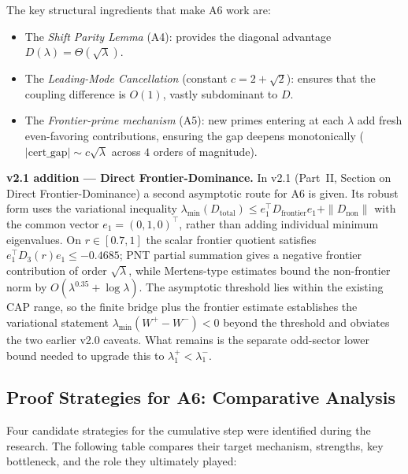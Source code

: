 \documentclass[12pt,a4paper]{article}
\theoremstyle{definition}
\theoremstyle{remark}
\begin{document}
\noindent The key structural ingredients that make A6 work are:
\begin{itemize}
  \item The \emph{Shift Parity Lemma} (A4): provides the diagonal advantage $D(\lambda) = \Theta(\sqrt{\lambda})$.
  \item The \emph{Leading-Mode Cancellation} (constant $c = 2 + \sqrt{2}$): ensures that the coupling difference is $O(1)$, vastly subdominant to $D$.
  \item The \emph{Frontier-prime mechanism} (A5): new primes entering at each $\lambda$ add fresh even-favoring contributions, ensuring the gap deepens monotonically ($|\mathrm{cert\_gap}| \sim c\sqrt{\lambda}$ across $4$ orders of magnitude).
\end{itemize}

\smallskip
\noindent\textbf{v2.1 addition --- Direct Frontier-Dominance.} In v2.1
(Part~II, Section on Direct Frontier-Dominance) a second asymptotic route for
A6 is given. Its robust form uses the variational inequality
$\lambda_{\min}(D_{\mathrm{total}})\leq e_1^\top D_{\mathrm{frontier}}e_1+\|D_{\mathrm{non}}\|$
with the common vector $e_1=(0,1,0)^\top$, rather than adding individual
minimum eigenvalues. On $r\in[0.7,1]$ the scalar frontier quotient satisfies
$e_1^\top D_3(r)e_1\leq -0.4685$; PNT partial summation gives a negative
frontier contribution of order $\sqrt{\lambda}$, while Mertens-type
estimates bound the non-frontier norm by $O(\lambda^{0.35}+\log\lambda)$.
The asymptotic threshold lies within the existing CAP range, so the finite
bridge plus the frontier estimate establishes the variational statement
$\lambda_{\min}(W^+-W^-)<0$ beyond the threshold and obviates the two earlier
v2.0 caveats. What remains is the separate odd-sector lower bound needed to
upgrade this to $\lambda_1^+<\lambda_1^-$.

\subsection{Proof Strategies for A6: Comparative Analysis}

Four candidate strategies for the cumulative step were identified during the research. The following table compares their target mechanism, strengths, key bottleneck, and the role they ultimately played:
\end{document}
